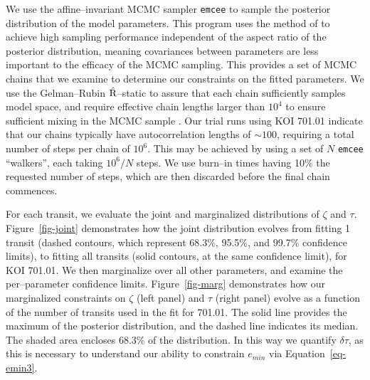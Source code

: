 We use the affine--invariant MCMC sampler {\tt emcee}
\citep{2013PASP..125..306F} to sample the posterior distribution of
the model parameters.  This program uses the method of
\cite{Goodman-Weare} to achieve high sampling performance independent
of the aspect ratio of the posterior distribution, meaning covariances
between parameters are less important to the efficacy of the MCMC
sampling.  This provides a set of MCMC chains that we examine to
determine our constraints on the fitted parameters.  We use the
Gelman--Rubin $\hat{\rm R}$--static \citep{Gelman92} to assure that
each chain sufficiently samples model space, and require effective
chain lengths larger than $10^4$ to ensure sufficient mixing in the
MCMC sample \cite[e.g.][]{2004PhRvD..69j3501T}.  Our trial runs using
KOI 701.01 indicate that our chains typically have autocorrelation
lengths of $\sim 100$, requiring a total number of steps per chain of
$10^6$.  This may be achieved by using a set of $N$ {\tt emcee}
``walkers'', each taking $10^6/N$ steps.  We use burn--in times having
10\% the requested number of steps, which are then discarded before
the final chain commences.

For each transit, we evaluate the joint and marginalized distributions
of $\zeta$ and $\tau$.  Figure~\ref{fig-joint} demonstrates how the
joint distribution evolves from fitting 1 transit (dashed contours,
which represent 68.3\%, 95.5\%, and 99.7\% confidence limits), to
fitting all transits (solid contours, at the same confidence limit),
for KOI 701.01.  We then marginalize over all other parameters, and
examine the per--parameter confidence limits.  Figure~\ref{fig-marg}
demonstrates how our marginalized constraints on $\zeta$ (left panel)
and $\tau$ (right panel) evolve as a function of the number of
transits used in the fit for 701.01.  The solid line provides the
maximum of the posterior distribution, and the dashed line indicates
its median.  The shaded area encloses 68.3\% of the distribution.  In
this way we quantify $\delta \tau$, as this is necessary to understand
our ability to constrain $e_{min}$ via Equation~\ref{eq-emin3}.

